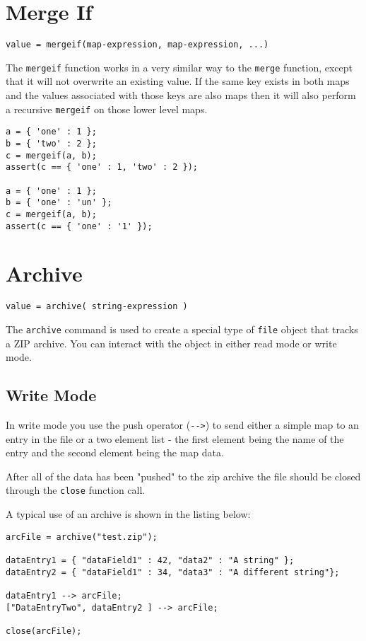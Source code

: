 \section{Merge If}
\begin{Verbatim}
value = mergeif(map-expression, map-expression, ...)
\end{Verbatim}

The \Verb+mergeif+ function works in a very similar way to the \verb+merge+ function, except that it will not overwrite an existing value. If the same key exists in both maps and the values associated with those keys are also maps then it will also perform a recursive \verb+mergeif+ on those lower level maps.

\begin{lstlisting}[caption={Merge If example}]
a = { 'one' : 1 };
b = { 'two' : 2 };
c = mergeif(a, b);
assert(c == { 'one' : 1, 'two' : 2 });

a = { 'one' : 1 };
b = { 'one' : 'un' };
c = mergeif(a, b);
assert(c == { 'one' : '1' });
\end{lstlisting}

\section{Archive}
\begin{Verbatim}
value = archive( string-expression )
\end{Verbatim}
The \Verb+archive+ command is used to create a special type of \verb+file+ object that tracks a ZIP archive. You can interact with the object in either read mode or write mode.
\subsection{Write Mode}
In write mode you use the push operator (\Verb+-->+) to send either a simple map to an entry in the file or a two element list - the first element being the name of the entry and the second element being the map data.

After all of the data has been "pushed" to the zip archive the file should be closed through the \Verb+close+ function call.

A typical use of an archive is shown in the listing below:
\begin{lstlisting}[caption={Write to Archive example}]
arcFile = archive("test.zip");

dataEntry1 = { "dataField1" : 42, "data2" : "A string" };
dataEntry2 = { "dataField1" : 34, "data3" : "A different string"};

dataEntry1 --> arcFile;
["DataEntryTwo", dataEntry2 ] --> arcFile;

close(arcFile);
\end{lstlisting}


